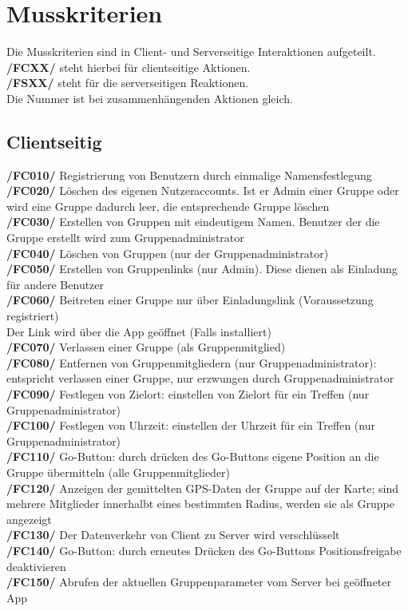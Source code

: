 \newpage
\section{Musskriterien}
Die Musskriterien sind in Client- und Serverseitige Interaktionen aufgeteilt.\\
\textbf{/FCXX/} steht hierbei für clientseitige Aktionen.\\
\textbf{/FSXX/} steht für die serverseitigen Reaktionen.\\
Die Nummer ist bei zusammenhängenden Aktionen gleich.\\
\subsection{Clientseitig}
     \textbf{/FC010/} Registrierung von Benutzern durch einmalige Namensfestlegung\\
     \textbf{/FC020/} Löschen des eigenen Nutzeraccounts. Ist er Admin einer Gruppe oder wird eine Gruppe dadurch leer, die entsprechende Gruppe löschen\\
     \textbf{/FC030/} Erstellen von Gruppen mit eindeutigem Namen. Benutzer der die Gruppe erstellt wird zum Gruppenadministrator\\
     \textbf{/FC040/} Löschen von Gruppen (nur der Gruppenadministrator)   \\
     \textbf{/FC050/} Erstellen von Gruppenlinks (nur Admin). Diese dienen als Einladung für andere Benutzer \\
     \textbf{/FC060/} Beitreten einer Gruppe nur über Einladungslink (Voraussetzung registriert) \\
     Der Link wird über die App geöffnet (Falls installiert) \\
     \textbf{/FC070/} Verlassen einer Gruppe (als Gruppenmitglied)\\
     \textbf{/FC080/} Entfernen von Gruppenmitgliedern (nur Gruppenadministrator): entspricht verlassen einer Gruppe, nur erzwungen durch Gruppenadministrator\\
     \textbf{/FC090/} Festlegen von Zielort: einstellen von Zielort für ein Treffen (nur Gruppenadministrator)\\
     \textbf{/FC100/} Festlegen von Uhrzeit: einstellen der Uhrzeit für ein Treffen (nur Gruppenadministrator) \\
     \textbf{/FC110/} Go-Button: durch drücken des Go-Buttons eigene Position an die Gruppe übermitteln (alle Gruppenmitglieder)\\
     \textbf{/FC120/} Anzeigen der gemittelten GPS-Daten der Gruppe auf der Karte; sind mehrere Mitglieder innerhalbt eines bestimmten Radius,
     werden sie als Gruppe angezeigt\\
     \textbf{/FC130/} Der Datenverkehr von Client zu Server wird verschlüsselt\\
     \textbf{/FC140/} Go-Button: durch erneutes Drücken des Go-Buttons Positionsfreigabe deaktivieren\\
     \textbf{/FC150/} Abrufen der aktuellen Gruppenparameter vom Server bei geöffneter App\\
